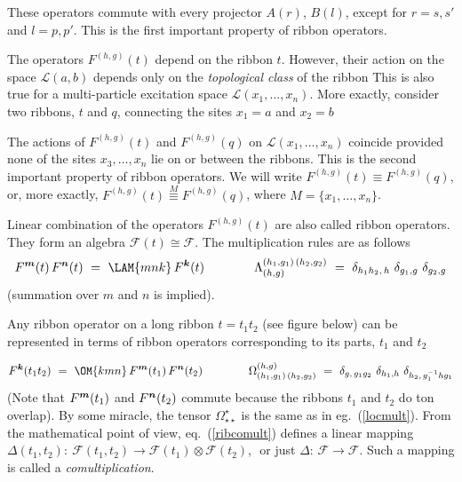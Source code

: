 \documentclass[12pt]{article}
\newcommand*{\epsfscale}[1]{\def\epsfsize##1##2{#1##1}}
\newcommand{\Om}{\Omega}
\newcommand{\Lam}{\Lambda}
\newcommand{\del}{\delta} %
\newcommand*{\boldind}[1]{{\mbox{\scriptsize\boldmath$#1$}}}
\newcommand*{\RF}[1]{F^\boldind{#1}}
\newcommand{\calF}{\mathcal{F}}
\newcommand{\calL}{\mathcal{L}}
\begin{document}
\noindent These operators commute with every projector $A(r)$, $B(l)$,
except for $r=s,s'$ and $l=p,p'$. This is the first important property of
ribbon operators. 

The operators $F^{(h,g)}(t)$ depend on the ribbon $t$. However, their action
on the space $\calL(a,b)$ depends only on the \emph{topological class} of the
ribbon This is also true for a multi-particle excitation space
$\calL(x_1,\ldots,x_n)$. More exactly, consider two ribbons, $t$ and $q$,
connecting the sites $x_1=a$ and $x_2=b$
\begin{figure}[h]
\centerline{\epsfscale{0.6}}
\end{figure}
The actions of $F^{(h,g)}(t)$ and $F^{(h,g)}(q)$ on $\calL(x_1,\ldots,x_n)$
coincide provided none of the sites $x_3,\ldots,x_n$ lie on or between the
ribbons. This is the second important property of ribbon operators. We will
write $F^{(h,g)}(t)\equiv F^{(h,g)}(q)$, or, more exactly, 
$F^{(h,g)}(t)\stackrel{M}{\equiv}F^{(h,g)}(q)$, where $M=\{x_1,\ldots,x_n\}$.

Linear combination of the operators $F^{(h,g)}(t)$ are also called ribbon
operators. They form an algebra $\calF(t)\cong\calF$. The multiplication rules
are as follows
\begin{equation} \label{rib_mult}
  \RF{m}(t)\, \RF{n}(t)\ =\ \LAM{mnk}\, \RF{k}(t) \qquad\qquad
  \Lam^{(h_1,g_1)\,(h_2,g_2)}_{(h,g)}\ =\
  \del_{h_1h_2,\,h}\ \del_{g_1,g}\ \del_{g_2,g}
\end{equation}
(summation over {\boldmath $m$ and $n$} is implied).

Any ribbon operator on a long ribbon $t=t_1t_2$ (see figure below) can be 
represented in terms of ribbon operators corresponding to its parts, $t_1$ and
$t_2$
\begin{figure}[h]
\centerline{\epsfscale{0.6}}
\end{figure}
\begin{equation} \label{ribcomult}
  \RF{k}(t_1t_2)\ =\ \OM{kmn}\, \RF{m}(t_1)\, \RF{n}(t_2) \qquad\qquad
  \Om^{(h,g)}_{(h_1,g_1)\,(h_2,g_2)}\ =\ 
  \del_{g,\,g_1g_2}\ \del_{h_1,h}\ \del_{h_2,\,g_1^{-1}hg_1}
\end{equation}
(Note that $\RF{m}(t_1)$ and $\RF{n}(t_2)$ commute because the ribbons $t_1$
and $t_2$ do ton overlap). By some miracle, the tensor
$\Om^{\star}_{\star\star}$ is the same as in eg.~(\ref{locmult}). From the
mathematical point of view, eq.~(\ref{ribcomult}) defines a linear mapping\,
$\Delta(t_1,t_2):\ \calF(t_1,t_2)\to\calF(t_1)\otimes\calF(t_2)$,\,\, or just
$\Delta:\,\calF\to\calF$. Such a mapping is called a \emph{comultiplication}.
\end{document}
